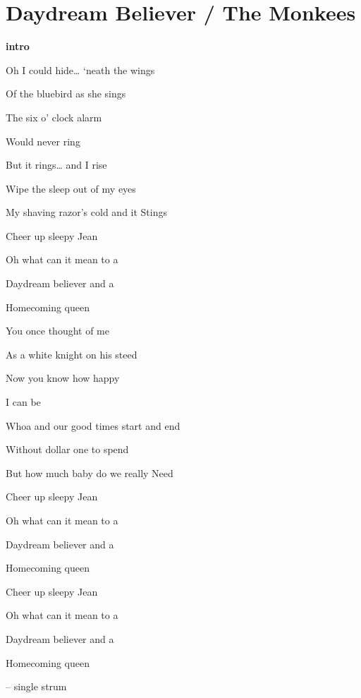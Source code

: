 \section{Daydream Believer / The Monkees}\label{sec:daydreambeliever}

\Gmajor
\Aminor
\Bminor
\EminorSeven
\AmajorSeven
\DmajorSeven
\DmajorEasy
\Eminor


\textbf{intro} 

Oh I could hide… ‘neath the wings

Of the bluebird as she sings

The six o’ clock alarm

Would never ring 

But it rings… and I rise

Wipe the sleep out of my eyes

My shaving razor’s cold and it
Stings

Cheer up sleepy Jean

Oh what can it mean to a

 Daydream believer and a

 Homecoming queen 

You once thought of me

As a white knight on his steed

Now you know how happy

I can be 

Whoa and our good times start and end

Without dollar one to spend

But how much baby do we really
Need

Cheer up sleepy Jean

Oh what can it mean to a

 Daydream believer and a

 Homecoming queen 

Cheer up sleepy Jean

Oh what can it mean to a

 Daydream believer and a

 Homecoming queen 

 – single strum
